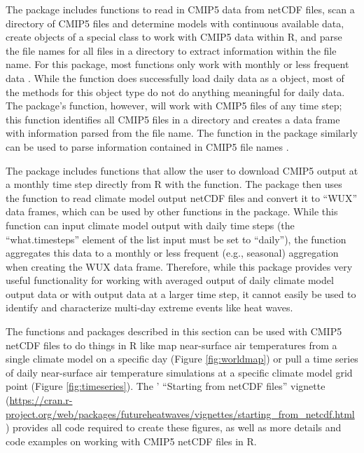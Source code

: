 The  package includes functions to read in CMIP5 data from
netCDF files, scan a directory of CMIP5 files and determine models with
continuous available data, create objects of a special 
class to work with CMIP5 data within R, and parse the file names for all
files in a directory to extract information within the file name. For
this package, most functions only work with monthly or less frequent
data \citep{RCMIP5}. While the  function does
successfully load daily data as a  object, most of the
methods for this object type do not do anything meaningful for daily
data. The package's  function, however, will work with
CMIP5 files of any time step; this function identifies all CMIP5 files
in a directory and creates a data frame with information parsed from the
file name. The  function in the
 package similarly can be used to parse information
contained in CMIP5 file names \citep{ncdf4.helpers}.

The  package \citep{wux} includes functions that allow the user
to download CMIP5 output at a monthly time step directly from R with the
 function. The package then uses the
 function to read climate model output netCDF files and
convert it to ``WUX'' data frames, which can be used by other functions
in the package. While this function can input climate model output with
daily time steps (the ``what.timesteps'' element of the
 list input must be set to ``daily''), the function
aggregates this data to a monthly or less frequent (e.g., seasonal)
aggregation when creating the WUX data frame. Therefore, while this
package provides very useful functionality for working with averaged
output of daily climate model output data or with output data at a
larger time step, it cannot easily be used to identify and characterize
multi-day extreme events like heat waves.

The functions and packages described in this section can be used with
CMIP5 netCDF files to do things in R like map near-surface air
temperatures from a single climate model on a specific day (Figure
\ref{fig:worldmap}) or pull a time series of daily near-surface air
temperature simulations at a specific climate model grid point (Figure
\ref{fig:timeseries}). The ' ``Starting from netCDF
files'' vignette
(\url{https://cran.r-project.org/web/packages/futureheatwaves/vignettes/starting_from_netcdf.html})
provides all code required to create these figures, as well as more
details and code examples on working with CMIP5 netCDF files in R.

